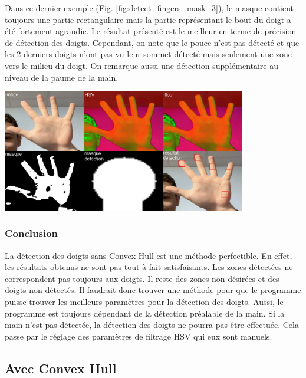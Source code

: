 \documentclass[11pt]{article}
\begin{document}
Dans ce dernier exemple (Fig. \ref{fig:detect_fingers_mask_3}), le masque contient toujours une partie rectangulaire mais la partie représentant le bout du doigt a été fortement agrandie.
Le résultat présenté est le meilleur en terme de précision de détection des doigts. Cependant, on note que le pouce n'est pas détecté et que les 2 derniers doigts n'ont pas vu leur sommet détecté mais seulement une zone vers le milieu du doigt. On remarque aussi une détection supplémentaire au niveau de la paume de la main.
\begin{center}
    \includegraphics[width=0.8\textwidth]{images/detect_fingers_mask_3.png}
    \label{fig:detect_fingers_mask_3}
\end{center}

\subsubsection{Conclusion}
La détection des doigts sans Convex Hull est une méthode perfectible. En effet, les résultats obtenus ne sont pas tout à fait satisfaisants. Les zones détectées ne correspondent pas toujours aux doigts. Il reste des zones non désirées et des doigts non détectés. Il faudrait donc trouver une méthode pour que le programme puisse trouver les meilleurs paramètres pour la détection des doigts.
Aussi, le programme est toujours dépendant de la détection préalable de la main. Si la main n'est pas détectée, la détection des doigts ne pourra pas être effectuée. Cela passe par le réglage des paramètres de filtrage HSV qui eux sont manuels.

\newpage


\subsection{Avec Convex Hull}
\end{document}
